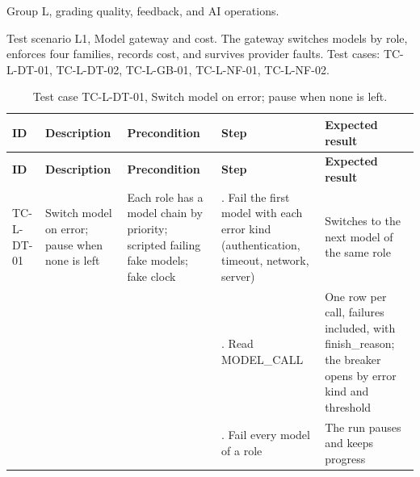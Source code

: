 Group L, grading quality, feedback, and AI operations.

Test scenario L1, Model gateway and cost. The gateway switches models by role, enforces four families, records cost, and survives provider faults. Test cases: TC-L-DT-01, TC-L-DT-02, TC-L-GB-01, TC-L-NF-01, TC-L-NF-02.

{\small
\begin{longtable}{|>{\raggedright\arraybackslash}p{}|>{\raggedright\arraybackslash}p{}|>{\raggedright\arraybackslash}p{}|>{\raggedright\arraybackslash}p{}|>{\raggedright\arraybackslash}p{}|}
\caption{Test case TC-L-DT-01, Switch model on error; pause when none is left.} \\
\hline
\textbf{ID} & \textbf{Description} & \textbf{Precondition} & \textbf{Step} & \textbf{Expected result} \\ \hline
\endfirsthead
\hline
\textbf{ID} & \textbf{Description} & \textbf{Precondition} & \textbf{Step} & \textbf{Expected result} \\ \hline
\endhead
TC-L-DT-01 & Switch model on error; pause when none is left & Each role has a model chain by priority; scripted failing fake models; fake clock & 1. Fail the first model with each error kind (authentication, timeout, network, server) & Switches to the next model of the same role \\ \hline
 &  &  & 2. Read MODEL\_CALL & One row per call, failures included, with finish\_reason; the breaker opens by error kind and threshold \\ \hline
 &  &  & 3. Fail every model of a role & The run pauses and keeps progress \\ \hline
\end{longtable}
}

